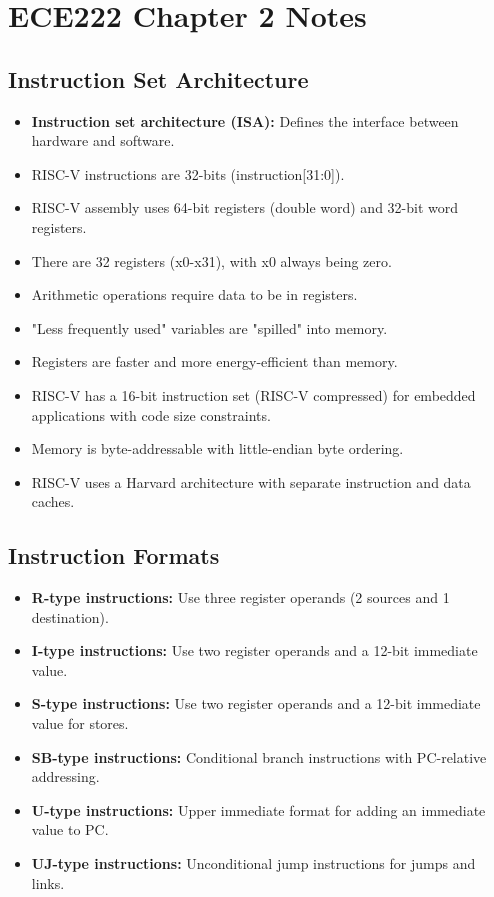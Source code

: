 \documentclass{article}
\begin{document}
\section*{ECE222 Chapter 2 Notes}

\subsection*{Instruction Set Architecture}
\begin{itemize}
    \item \textbf{Instruction set architecture (ISA):} Defines the interface between hardware and software.
    \item RISC-V instructions are 32-bits (instruction[31:0]).
    \item RISC-V assembly uses 64-bit registers (double word) and 32-bit word registers.
    \item There are 32 registers (x0-x31), with x0 always being zero.
    \item Arithmetic operations require data to be in registers.
    \item "Less frequently used" variables are "spilled" into memory.
    \item Registers are faster and more energy-efficient than memory.
    \item RISC-V has a 16-bit instruction set (RISC-V compressed) for embedded applications with code size constraints.
    \item Memory is byte-addressable with little-endian byte ordering.
    \item RISC-V uses a Harvard architecture with separate instruction and data caches.
\end{itemize}

\subsection*{Instruction Formats}
\begin{itemize}
    \item \textbf{R-type instructions:} Use three register operands (2 sources and 1 destination).
    \item \textbf{I-type instructions:} Use two register operands and a 12-bit immediate value.
    \item \textbf{S-type instructions:} Use two register operands and a 12-bit immediate value for stores.
    \item \textbf{SB-type instructions:} Conditional branch instructions with PC-relative addressing.
    \item \textbf{U-type instructions:} Upper immediate format for adding an immediate value to PC.
    \item \textbf{UJ-type instructions:} Unconditional jump instructions for jumps and links.
\end{itemize}
\end{document}
